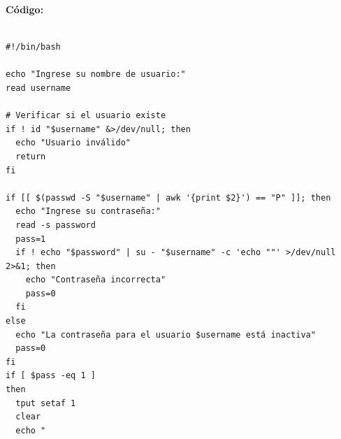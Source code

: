 \documentclass[12pt,a4paper]{article}
\begin{document}
    \newpage
\textbf{Código:}
    \begin{lstlisting}[style=BashInputStyle]
 
#!/bin/bash

echo "Ingrese su nombre de usuario:"
read username

# Verificar si el usuario existe
if ! id "$username" &>/dev/null; then
  echo "Usuario inválido"
  return  
fi

if [[ $(passwd -S "$username" | awk '{print $2}') == "P" ]]; then
  echo "Ingrese su contraseña:"
  read -s password
  pass=1
  if ! echo "$password" | su - "$username" -c 'echo ""' >/dev/null 2>&1; then
    echo "Contraseña incorrecta"
    pass=0
  fi
else
  echo "La contraseña para el usuario $username está inactiva"
  pass=0
fi
if [ $pass -eq 1 ]
then
  tput setaf 1
  clear
  echo "
  

\end{lstlisting}
\end{document}
